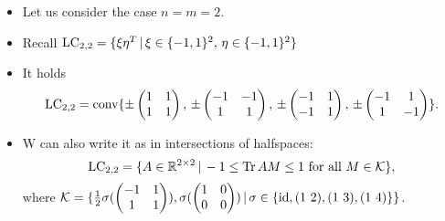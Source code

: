 \begin{frame}
	\begin{itemize}
		\item<1-> Let us consider the case $ n=m=2 $.
		\item<2-> {\footnotesize Recall $ \textup{LC}_{2,2} = \{ \xi \eta^T \, | \, \xi \in \{ -1,1 \}^2, \, \eta \in \{ -1,1 \}^2 \} $}
		\item <2-> It holds 
		\begin{align*}
		\textup{LC}_{2,2}= \textup{conv} \{ \pm \begin{pmatrix}
		1 & 1 \\
		1 & 1
		\end{pmatrix} , \, \pm \begin{pmatrix}
		-1 & -1 \\
		1 & 1
		\end{pmatrix} , \, \pm \begin{pmatrix}
		-1 & 1 \\
		-1 & 1
		\end{pmatrix}, \, \pm \begin{pmatrix}
		-1 & 1 \\
		1 & -1
		\end{pmatrix}  \}.
		\end{align*}
		\item<3->
		W can also write it as in intersections of halfspaces: 
			\begin{equation}\label{facetsLC}
			\textup{LC}_{2,2} = \{ A \in \mathbb{R}^{2 \times 2} \, | \, -1 \le  \text{Tr} \, {AM}  \le 1 \textup{ for all } M \in \mathcal{K} \},
			\end{equation}
			where $ \mathcal{K}  = \{ \frac{1}{2}\sigma(\begin{pmatrix}
			-1 & 1 \\
			1 & 1
			\end{pmatrix}), \sigma(\begin{pmatrix}
			1 & 0 \\
			0 & 0
			\end{pmatrix}) \, | \,  \sigma \in \{ \textup{id}, (1 \, \, 2), (1 \, \, 3), (1 \, \, 4) \} \} $.
		\end{itemize}
\end{frame}


